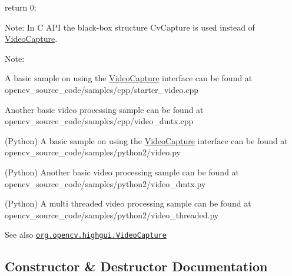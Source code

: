 {\ttfamily }

{\ttfamily }

{\ttfamily return 0;}

{\ttfamily }

{\ttfamily }

{\ttfamily Note\+: In C A\+PI the black-\/box structure {\ttfamily Cv\+Capture} is used instead of {\ttfamily \mbox{\hyperlink{classorg_1_1opencv_1_1highgui_1_1_video_capture}{Video\+Capture}}}. }

Note\+:


\begin{DoxyItemize}
\item A basic sample on using the \mbox{\hyperlink{classorg_1_1opencv_1_1highgui_1_1_video_capture}{Video\+Capture}} interface can be found at opencv\+\_\+source\+\_\+code/samples/cpp/starter\+\_\+video.\+cpp 
\item Another basic video processing sample can be found at opencv\+\_\+source\+\_\+code/samples/cpp/video\+\_\+dmtx.\+cpp 
\item (Python) A basic sample on using the \mbox{\hyperlink{classorg_1_1opencv_1_1highgui_1_1_video_capture}{Video\+Capture}} interface can be found at opencv\+\_\+source\+\_\+code/samples/python2/video.\+py 
\item (Python) Another basic video processing sample can be found at opencv\+\_\+source\+\_\+code/samples/python2/video\+\_\+dmtx.\+py 
\item (Python) A multi threaded video processing sample can be found at opencv\+\_\+source\+\_\+code/samples/python2/video\+\_\+threaded.\+py 
\end{DoxyItemize}

\begin{DoxySeeAlso}{See also}
\href{http://docs.opencv.org/modules/highgui/doc/reading_and_writing_images_and_video.html#videocapture}{\tt org.\+opencv.\+highgui.\+Video\+Capture} 
\end{DoxySeeAlso}


\subsection{Constructor \& Destructor Documentation}
\mbox{\label{classorg_1_1opencv_1_1highgui_1_1_video_capture_a64df16f6351123a0c1040c00d23a2db8}} 
